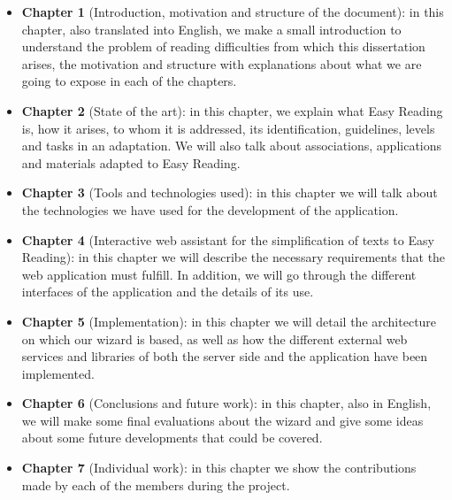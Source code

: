  \setlength{\parskip}{10pt}
 \begin{itemize}
\item {\textbf{Chapter 1}} (Introduction, motivation and structure of the document): in this chapter, also translated into English, we make a small introduction to understand the problem of reading difficulties from which this dissertation arises, the motivation and structure with explanations about what we are going to expose in each of the chapters.

 \setlength{\parskip}{10pt}
 
\item {\textbf{Chapter 2}} (State of the art): in this chapter, we explain what Easy Reading is, how it arises, to whom it is addressed, its identification, guidelines, levels and tasks in an adaptation. We will also talk about associations, applications and materials adapted to Easy Reading. 

 \setlength{\parskip}{10pt}

\item {\textbf{Chapter 3}} (Tools and technologies used): in this chapter we will talk about the technologies we have used for the development of the application.

 \setlength{\parskip}{10pt}

\item {\textbf{Chapter 4}} (Interactive web assistant for the simplification of texts to Easy Reading): in this chapter we will describe the necessary requirements that the web application must fulfill. In addition, we will go through the different interfaces of the application and the details of its use. 

 \setlength{\parskip}{10pt}

\item {\textbf{Chapter 5}} (Implementation): in this chapter we will detail the architecture on which our wizard is based, as well as how the different external web services and libraries of both the server side and the application have been implemented. 

 \setlength{\parskip}{10pt}

\item{\textbf{Chapter 6}} (Conclusions and future work): in this chapter, also in English, we will make some final evaluations about the wizard and give some ideas about some future developments that could be covered.

 \setlength{\parskip}{10pt}

\item{\textbf{Chapter 7}} (Individual work): in this chapter we show the contributions made by each of the members during the project.

\end{itemize}







